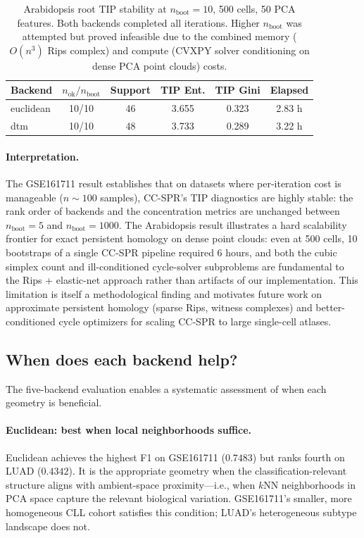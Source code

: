 \documentclass[11pt]{article}
\begin{document}
\begin{table}[h]
\centering
\small
\begin{tabular}{lccccc}
\toprule
Backend & $n_{\text{ok}}/n_{\text{boot}}$ & Support & TIP Ent. & TIP Gini & Elapsed \\
\midrule
euclidean & 10/10 & 46 & 3.655 & 0.323 & 2.83 h \\
dtm       & 10/10 & 48 & 3.733 & 0.289 & 3.22 h \\
\bottomrule
\end{tabular}
\caption{Arabidopsis root TIP stability at $n_{\text{boot}} = 10$, 500 cells, 50 PCA features.
Both backends completed all iterations.
Higher $n_{\text{boot}}$ was attempted but proved infeasible due to the combined memory ($O(n^3)$ Rips complex) and compute (CVXPY solver conditioning on dense PCA point clouds) costs.}
\label{tab:arab_boot10}
\end{table}

\paragraph{Interpretation.}
The GSE161711 result establishes that on datasets where per-iteration cost is manageable ($n \sim 100$ samples), CC-SPR's TIP diagnostics are highly stable: the rank order of backends and the concentration metrics are unchanged between $n_{\text{boot}} = 5$ and $n_{\text{boot}} = 1000$.
The Arabidopsis result illustrates a hard scalability frontier for exact persistent homology on dense point clouds: even at 500 cells, 10 bootstraps of a single CC-SPR pipeline required 6 hours, and both the cubic simplex count and ill-conditioned cycle-solver subproblems are fundamental to the Rips + elastic-net approach rather than artifacts of our implementation.
This limitation is itself a methodological finding and motivates future work on approximate persistent homology (sparse Rips, witness complexes) and better-conditioned cycle optimizers for scaling CC-SPR to large single-cell atlases.

\subsection{When does each backend help?}

The five-backend evaluation enables a systematic assessment of when each geometry is beneficial.

\paragraph{Euclidean: best when local neighborhoods suffice.}
Euclidean achieves the highest F1 on GSE161711 ($0.7483$) but ranks fourth on LUAD ($0.4342$).
It is the appropriate geometry when the classification-relevant structure aligns with ambient-space proximity---i.e., when $k$NN neighborhoods in PCA space capture the relevant biological variation.
GSE161711's smaller, more homogeneous CLL cohort satisfies this condition; LUAD's heterogeneous subtype landscape does not.
\end{document}
